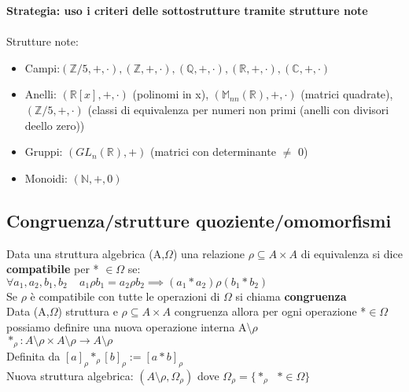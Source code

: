 \documentclass{article}
\begin{document}
\begin{multicols*}{3}
		\textbf{Strategia: uso i criteri delle sottostrutture tramite strutture note}\\\\
		Strutture note:
		\begin{itemize}
			\item Campi:\( (\mathbb{Z}/5,+,\cdot),(\mathbb{Z},+,\cdot),(\mathbb{Q},+,\cdot),(\mathbb{R},+,\cdot),(\mathbb{C},+,\cdot)\)
			\item Anelli: \((\mathbb{R}[x],+,\cdot)\) (polinomi in x), \((\mathbb{M}_{nn}(\mathbb{R}),+,\cdot)\) (matrici quadrate), \((\mathbb{Z}/5,+,\cdot)\) (classi di equivalenza per numeri non primi (anelli con divisori deello zero))
			\item Gruppi: \((GL_n(\mathbb{R}),+)\) (matrici con determinante \(\neq\) 0)
			\item Monoidi: \((\mathbb{N},+,0)\) 
		\end{itemize} 
		\subsection{Congruenza/strutture quoziente/omomorfismi}
		Data una struttura algebrica (A,\(\Omega\)) una relazione \(\rho \subseteq A\times A\) di equivalenza si dice \textbf{compatibile} per * \(\in \Omega\) se: \\
		\(\forall a_1,a_2,b_1,b_2 \:\:\:\:\: a_1 \rho b_1 = a_2\rho b_2 \implies (a_1*a_2)\rho (b_1*b_2) \)\\
		Se \(\rho\) è compatibile con tutte le operazioni di \(\Omega\) si chiama \textbf{congruenza}\\
		
		
		Data (A,\(\Omega\)) struttura e \(\rho \subseteq A\times A\) congruenza allora per ogni operazione *\(\in \Omega\) possiamo definire una nuova operazione interna A\textbackslash\(\rho\)\\
		\(*_{\rho} : A \setminus \rho \times A \setminus \rho \rightarrow A \setminus \rho\)\\
		Definita da \([a]_\rho *_\rho [b]_\rho := [a*b]_\rho\)\\
		Nuova struttura algebrica: \((A\setminus \rho ,\Omega_\rho)\) dove \(\Omega_\rho = \{*_\rho \:\:\: *\in \Omega\}\)\\
		

\end{multicols*}
\end{document}
